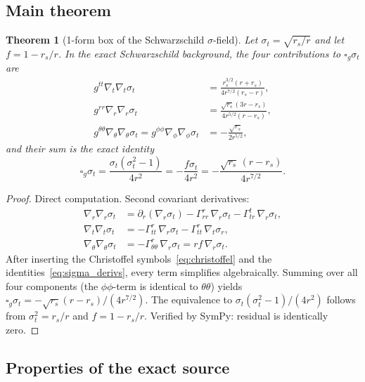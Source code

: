 \documentclass[11pt,a4paper]{article}
\theoremstyle{plain}
\newtheorem{theorem}{Theorem}[section]
\theoremstyle{definition}
\newcommand{\sig}{\sigma}
\newcommand{\sigt}{\sigma_t}
\newcommand{\rs}{r_s}
\newcommand{\boxg}{\square_g}
\begin{document}
\subsection{Main theorem}

\begin{theorem}[1-form box of the Schwarzschild $\sig$-field]
\label{thm:box}
Let $\sigt = \sqrt{\rs/r}$ and let $f = 1 - \rs/r$.  In the exact
Schwarzschild background, the four contributions to
$\boxg\sigt$ are
\begin{align*}
  g^{tt}\nabla_t\nabla_t\sigt &= \frac{\rs^{3/2}(r+\rs)}{4r^{7/2}(\rs-r)}, \\
  g^{rr}\nabla_r\nabla_r\sigt &= \frac{\sqrt{\rs}(3r-\rs)}{4r^{5/2}(r-\rs)}, \\
  g^{\theta\theta}\nabla_\theta\nabla_\theta\sigt
  = g^{\phi\phi}\nabla_\phi\nabla_\phi\sigt
  &= -\frac{\sqrt{\rs}}{2r^{5/2}},
\end{align*}
and their sum is the exact identity
\begin{equation}\label{eq:box_result}
  \boxed{
    \boxg\sigt
    = \frac{\sigt(\sigt^2-1)}{4r^2}
    = -\frac{f\sigt}{4r^2}
    = -\frac{\sqrt{\rs}\,(r-\rs)}{4r^{7/2}}.
  }
\end{equation}
\end{theorem}

\begin{proof}
Direct computation.  Second covariant derivatives:
\begin{align*}
  \nabla_r\nabla_r\sigt
  &= \partial_r(\nabla_r\sigt)
  - \Gamma^r_{rr}\,\nabla_r\sigt
  - \Gamma^t_{tr}\,\nabla_r\sigt, \\
  \nabla_t\nabla_t\sigt
  &= -\Gamma^r_{tt}\,\nabla_r\sigt - \Gamma^r_{tt}\,\nabla_t\sig_r, \\
  \nabla_\theta\nabla_\theta\sigt
  &= -\Gamma^r_{\theta\theta}\,\nabla_r\sigt = rf\,\nabla_r\sigt.
\end{align*}
After inserting the Christoffel symbols~\eqref{eq:christoffel}
and the identities~\eqref{eq:sigma_derivs}, every term simplifies
algebraically.  Summing over all four components (the
$\phi\phi$-term is identical to $\theta\theta$) yields
$\boxg\sigt = -\sqrt{\rs}(r-\rs)/(4r^{7/2})$.
The equivalence to $\sigt(\sigt^2-1)/(4r^2)$ follows from
$\sigt^2 = \rs/r$ and $f = 1-\rs/r$.
Verified by SymPy: residual is identically zero.
\end{proof}

\subsection{Properties of the exact source}
\end{document}
